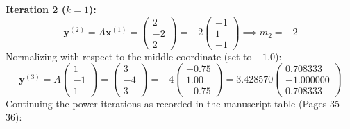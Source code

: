 \textbf{Iteration 2 ($k = 1$):}
\begin{equation}
    \mathbf{y}^{(2)} = A \mathbf{x}^{(1)} = \begin{pmatrix} 2 \\ -2 \\ 2 \end{pmatrix} = -2 \begin{pmatrix} -1 \\ 1 \\ -1 \end{pmatrix} \implies m_2 = -2
\end{equation}
Normalizing with respect to the middle coordinate (set to $-1.0$):
\begin{equation}
    \mathbf{y}^{(3)} = A \begin{pmatrix} 1 \\ -1 \\ 1 \end{pmatrix} = \begin{pmatrix} 3 \\ -4 \\ 3 \end{pmatrix} = -4 \begin{pmatrix} -0.75 \\ 1.00 \\ -0.75 \end{pmatrix} = 3.428570 \begin{pmatrix} 0.708333 \\ -1.000000 \\ 0.708333 \end{pmatrix}
\end{equation}
Continuing the power iterations as recorded in the manuscript table (Pages 35--36):
